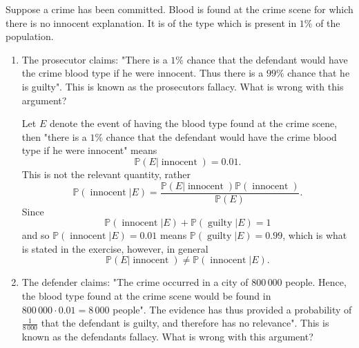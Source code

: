 \begin{example}
	Suppose a crime has been committed. Blood is found at the crime scene for which there is no innocent explanation. It is of the type which is present in $1\%$ of the population.
	
	\begin{enumerate}
		\item The prosecutor claims: "There is a $1\%$ chance that the defendant would have the crime blood type if he were innocent. Thus there is a $99\%$ chance that he is guilty". This is known as the prosecutors fallacy. What is wrong with this argument?
		
		Let $E$ denote the event of having the blood type found at the crime scene, then "there is a $1\%$ chance that the defendant would have the crime blood type if he were innocent" means
		\begin{equation}
			\mathbb{P}(E|\operatorname{innocent})=0.01.
		\end{equation}
		This is not the relevant quantity, rather
		\begin{equation}
			\mathbb{P}(\operatorname{innocent}|E)=\frac{\mathbb{P}(E|\operatorname{innocent})\mathbb{P}(\operatorname{innocent})}{\mathbb{P}(E)}.
		\end{equation}
		Since
		\begin{equation}
			\mathbb{P}(\operatorname{innocent}|E)+\mathbb{P}(\operatorname{guilty}|E)=1
		\end{equation}
		and so $\mathbb{P}(\operatorname{innocent}|E)=0.01$ means $\mathbb{P}(\operatorname{guilty}|E)=0.99$, which is what is stated in the exercise, however, in general
		\begin{equation}
			\mathbb{P}(E|\operatorname{innocent})\neq \mathbb{P}(\operatorname{innocent}|E).
		\end{equation}
		
		\item The defender claims: "The crime occurred in a city of $800\, 000$ people. Hence, the blood type found at the crime scene would be found in $800\, 000 \cdot 0.01=8\, 000$ people". The evidence has thus provided a probability of $\frac{1}{8\, 000}$ that the defendant is guilty, and therefore has no relevance". This is known as the defendants fallacy. What is wrong with this argument?
		

\end{enumerate}
\end{example}
